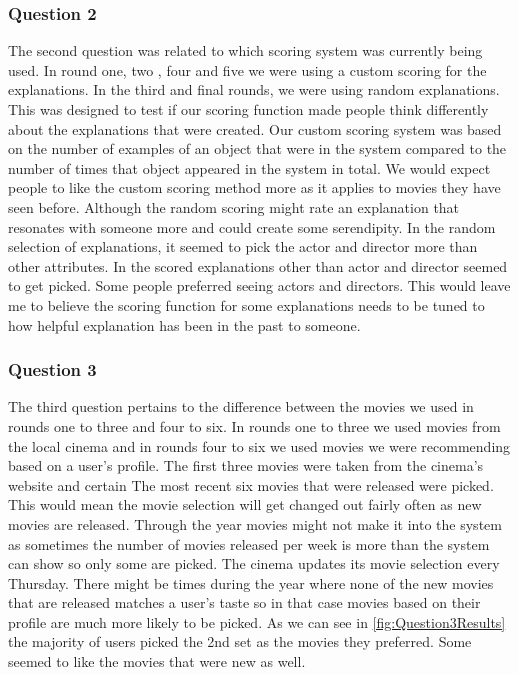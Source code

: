             \subsubsection{Question 2}

                The second question was related to which scoring system was currently being used. In round one, two , four and five we were using a custom scoring for the explanations. In the third and final rounds, we were using random explanations. This was designed to test if our scoring function made people think differently about the explanations that were created. Our custom scoring system was based on the number of examples of an object that were in the system compared to the number of times that object appeared in the system in total. We would expect people to like the custom scoring method more as it applies to movies they have seen before. Although the random scoring might rate an explanation that resonates with someone more and could create some serendipity. In the random selection of explanations, it seemed to pick the actor and director more than other attributes. In the scored explanations  other than actor and director seemed to get picked. Some people preferred seeing actors and directors. This would leave me to believe the scoring function for some explanations needs to be tuned to how helpful explanation has been in the past to someone. 

            \subsubsection{Question 3}
                The third question pertains to the difference between the movies we used in rounds one to three and four to six. In rounds one to three we used movies from the local cinema and in rounds four to six we used movies we were recommending based on a user's profile. The first three movies were taken from the cinema's website and certain The most recent six movies that were released were picked. This would mean the movie selection will get changed out fairly often as new movies are released. Through the year movies might not make it into the system as sometimes the number of movies released per week is more than the system can show so only some are picked. The cinema updates its movie selection every Thursday. There might be times during the year where none of the new movies that are released matches a user's taste so in that case movies based on their profile are much more likely to be picked. As we can see in \ref{fig:Question3Results} the majority of users picked the 2nd set as the movies they preferred. Some seemed to like the movies that were new as well. 


